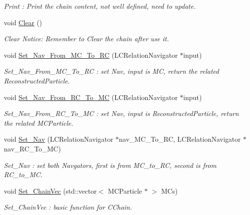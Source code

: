 \begin{DoxyCompactItemize}
\begin{DoxyCompactList}\small\item\em Print : Print the chain content, not well defined, need to update. \item\end{DoxyCompactList}\item 
void \hyperlink{classToolSet_1_1CChain__Vec_a3068461a3bd0fe085f522e6bb2d24f07}{Clear} ()
\begin{DoxyCompactList}\small\item\em Clear Notice: Remember to Clear the chain after use it. \item\end{DoxyCompactList}\item 
void \hyperlink{classToolSet_1_1CChain__Vec_aa9b42030de1b1ceb6da2c01d139e74b6}{Set\_\-Nav\_\-From\_\-MC\_\-To\_\-RC} (LCRelationNavigator $\ast$input)
\begin{DoxyCompactList}\small\item\em Set\_\-Nav\_\-From\_\-MC\_\-To\_\-RC : set Nav, input is MC, return the related ReconstructedParticle. \item\end{DoxyCompactList}\item 
void \hyperlink{classToolSet_1_1CChain__Vec_afe1fa08d6a66df76ff6e2607f6832979}{Set\_\-Nav\_\-From\_\-RC\_\-To\_\-MC} (LCRelationNavigator $\ast$input)
\begin{DoxyCompactList}\small\item\em Set\_\-Nav\_\-From\_\-RC\_\-To\_\-MC : set Nav, input is ReconstructedParticle, return the related MCParticle. \item\end{DoxyCompactList}\item 
void \hyperlink{classToolSet_1_1CChain__Vec_ab62d10b8212ef4ad8eb6ba50e23fc9a0}{Set\_\-Nav} (LCRelationNavigator $\ast$nav\_\-MC\_\-To\_\-RC, LCRelationNavigator $\ast$nav\_\-RC\_\-To\_\-MC)
\begin{DoxyCompactList}\small\item\em Set\_\-Nav : set both Navgators, first is from MC\_\-to\_\-RC, second is from RC\_\-to\_\-MC. \item\end{DoxyCompactList}\item 
void \hyperlink{classToolSet_1_1CChain__Vec_a855f3bc2ba6a30a7773ed7e8156d1823}{Set\_\-ChainVec} (std::vector$<$ MCParticle $\ast$ $>$ MCs)
\begin{DoxyCompactList}\small\item\em Set\_\-ChainVec : basic function for CChain. \item\end{DoxyCompactList}\item 

\end{DoxyCompactItemize}
